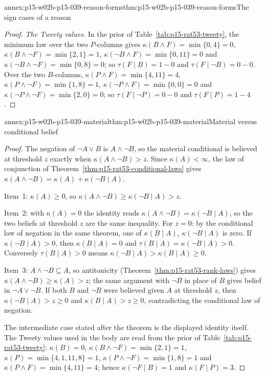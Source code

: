 \begin{annexitem}{annex:p15-w02b-p15-039-reason-forms}{thm:p15-w02b-p15-039-reason-forms}{The sign cases of a reason}
\begin{proof}
\emph{The Tweety values.}  In the prior of
Table~\ref{tab:p15-rat53-tweety}, the minimum law over the two \(P\)-columns
gives \(\kappa(B\land F)=\min\{0,4\}=0\),
\(\kappa(B\land\neg F)=\min\{2,1\}=1\), \(\kappa(\neg B\land F)=\min\{0,11\}=0\)
and \(\kappa(\neg B\land\neg F)=\min\{0,8\}=0\); so \(\tau(F\mid B)=1-0\)
and \(\tau(F\mid\neg B)=0-0\).  Over the two \(B\)-columns,
\(\kappa(P\land F)=\min\{4,11\}=4\), \(\kappa(P\land\neg F)=\min\{1,8\}=1\),
\(\kappa(\neg P\land F)=\min\{0,0\}=0\) and
\(\kappa(\neg P\land\neg F)=\min\{2,0\}=0\); so \(\tau(F\mid\neg P)=0-0\)
and \(\tau(F\mid P)=1-4\).
\end{proof}
\end{annexitem}

\begin{annexitem}{annex:p15-w02b-p15-039-material}{thm:p15-w02b-p15-039-material}{Material versus conditional belief}
\begin{proof}
The negation of \(\neg A\lor B\) is \(A\land\neg B\), so the material
conditional is believed at threshold \(z\) exactly when
\(\kappa(A\land\neg B)>z\).  Since \(\kappa(A)<\infty\), the law of
conjunction of Theorem~\ref{thm:p15-rat53-conditional-laws} gives
\(\kappa(A\land\neg B)=\kappa(A)+\kappa(\neg B\mid A)\).

Item~1: \(\kappa(A)\geq0\), so
\(\kappa(A\land\neg B)\geq\kappa(\neg B\mid A)>z\).

Item~2: with \(\kappa(A)=0\) the identity reads
\(\kappa(A\land\neg B)=\kappa(\neg B\mid A)\), so the two beliefs at
threshold \(z\) are the same inequality.  For \(z=0\): by the conditional
law of negation in the same theorem, one of \(\kappa(B\mid A)\),
\(\kappa(\neg B\mid A)\) is zero.  If \(\kappa(\neg B\mid A)>0\), then
\(\kappa(B\mid A)=0\) and \(\tau(B\mid A)=\kappa(\neg B\mid A)>0\).
Conversely \(\tau(B\mid A)>0\) means
\(\kappa(\neg B\mid A)>\kappa(B\mid A)\geq0\).

Item~3: \(A\land\neg B\subseteq A\), so antitonicity
(Theorem~\ref{thm:p15-rat53-rank-laws}) gives
\(\kappa(A\land\neg B)\geq\kappa(A)>z\); the same argument with \(\neg B\)
in place of \(B\) gives belief in \(\neg A\lor\neg B\).  If both \(B\)
and \(\neg B\) were believed given \(A\) at threshold \(z\), then
\(\kappa(\neg B\mid A)>z\geq0\) and \(\kappa(B\mid A)>z\geq0\),
contradicting the conditional law of negation.

The intermediate case stated after the theorem is the displayed identity
itself.  The Tweety values used in the body are read from the prior of
Table~\ref{tab:p15-rat53-tweety}: \(\kappa(B)=0\),
\(\kappa(B\land\neg F)=\min\{2,1\}=1\), \(\kappa(P)=\min\{4,1,11,8\}=1\),
\(\kappa(P\land\neg F)=\min\{1,8\}=1\) and
\(\kappa(P\land F)=\min\{4,11\}=4\); hence \(\kappa(\neg F\mid B)=1\) and
\(\kappa(F\mid P)=3\).
\end{proof}
\end{annexitem}

